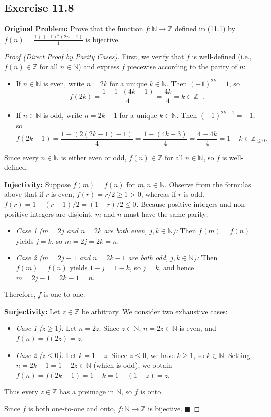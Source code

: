 \documentclass[11pt, letterpaper]{article}
\theoremstyle{definition}
\theoremstyle{remark}
\begin{document}
\subsection*{Exercise 11.8}
\textbf{Original Problem:} Prove that the function $f : \mathbb{N} \to \mathbb{Z}$ defined in (11.1) by $f(n) = \frac{1 + (-1)^n(2n - 1)}{4}$ is bijective.

\begin{proof}[Proof (Direct Proof by Parity Cases)]
First, we verify that $f$ is well-defined (i.e., $f(n) \in \mathbb{Z}$ for all $n \in \mathbb{N}$) and express $f$ piecewise according to the parity of $n$:
\begin{itemize}
    \item If $n \in \mathbb{N}$ is even, write $n = 2k$ for a unique $k \in \mathbb{N}$. Then $(-1)^{2k} = 1$, so
    \[
    f(2k) = \frac{1 + 1\cdot(4k - 1)}{4} = \frac{4k}{4} = k \in \mathbb{Z}^+.
    \]
    \item If $n \in \mathbb{N}$ is odd, write $n = 2k - 1$ for a unique $k \in \mathbb{N}$. Then $(-1)^{2k-1} = -1$, so
    \[
    f(2k - 1) = \frac{1 - (2(2k - 1) - 1)}{4} = \frac{1 - (4k - 3)}{4} = \frac{4 - 4k}{4} = 1 - k \in \mathbb{Z}_{\leq 0}.
    \]
\end{itemize}
Since every $n \in \mathbb{N}$ is either even or odd, $f(n) \in \mathbb{Z}$ for all $n \in \mathbb{N}$, so $f$ is well-defined.

\textbf{Injectivity:} Suppose $f(m) = f(n)$ for $m, n \in \mathbb{N}$. Observe from the formulas above that if $r$ is even, $f(r) = r/2 \geq 1 > 0$, whereas if $r$ is odd, $f(r) = 1 - (r+1)/2 = (1 - r)/2 \leq 0$. Because positive integers and non-positive integers are disjoint, $m$ and $n$ must have the same parity:
\begin{itemize}
    \item \textit{Case 1 ($m = 2j$ and $n = 2k$ are both even, $j, k \in \mathbb{N}$):} Then $f(m) = f(n)$ yields $j = k$, so $m = 2j = 2k = n$.
    \item \textit{Case 2 ($m = 2j - 1$ and $n = 2k - 1$ are both odd, $j, k \in \mathbb{N}$):} Then $f(m) = f(n)$ yields $1 - j = 1 - k$, so $j = k$, and hence $m = 2j - 1 = 2k - 1 = n$.
\end{itemize}
Therefore, $f$ is one-to-one.

\textbf{Surjectivity:} Let $z \in \mathbb{Z}$ be arbitrary. We consider two exhaustive cases:
\begin{itemize}
    \item \textit{Case 1 ($z \geq 1$):} Let $n = 2z$. Since $z \in \mathbb{N}$, $n = 2z \in \mathbb{N}$ is even, and $f(n) = f(2z) = z$.
    \item \textit{Case 2 ($z \leq 0$):} Let $k = 1 - z$. Since $z \leq 0$, we have $k \geq 1$, so $k \in \mathbb{N}$. Setting $n = 2k - 1 = 1 - 2z \in \mathbb{N}$ (which is odd), we obtain $f(n) = f(2k - 1) = 1 - k = 1 - (1 - z) = z$.
\end{itemize}
Thus every $z \in \mathbb{Z}$ has a preimage in $\mathbb{N}$, so $f$ is onto.

Since $f$ is both one-to-one and onto, $f : \mathbb{N} \to \mathbb{Z}$ is bijective. $\blacksquare$
\end{proof}
\end{document}
